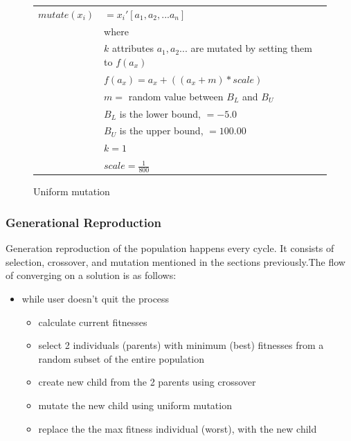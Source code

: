 \begin{figure}[!h]
        \begin{center}
		\begin{tabular}{r l}
		$ mutate(x_i) $ & $ = x_{i}{'}[a_1,a_2, ... a_n] $  \\
				& where \\
				& $ k $ attributes $ a_1, a_2... $ are mutated by setting them to $ f(a_x)  $ \\
				& $ f(a_x) = a_x + ( (a_x + m) * scale ) $ \\
				& $ m = $ random value between $ B_L $ and $B_U$ \\
				& $ B_L $ is the lower bound, $ = -5.0$ \\
				& $ B_U $ is the upper bound, $ = 100.00$ \\
				& $ k = 1 $ \\
				& $ scale = \frac{1}{800}$ 
		\end{tabular} 
               	\caption{Uniform mutation}
                \label{uniform_mutation}
        \end{center}
\end{figure}

\subsubsection{Generational Reproduction}
Generation reproduction of the population happens every cycle. It consists of
selection, crossover, and mutation mentioned in the sections previously.The 
flow of converging on a solution is as follows:
\begin{itemize}
	\item while user doesn't quit the process
	\begin{itemize}
		\item calculate current fitnesses
		\item select 2 individuals (parents) with minimum (best) fitnesses from a random subset of the entire population
		\item create new child from the 2 parents using crossover
		\item mutate the new child using uniform mutation
		\item replace the the max fitness individual (worst), with the new child
	\end{itemize}
\end{itemize}

\pagebreak
